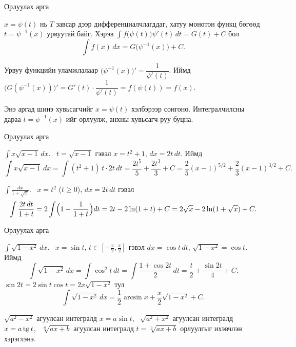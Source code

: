 \begin{frame}[allowframebreaks]{Орлуулах арга}
\begin{theorem}\label{huvsagch}
$x=\psi(t)$ нь $T$ завсар дээр дифференциалчлагддаг, хатуу монотон функц бөгөөд $t=\psi^{-1}(x)$ урвуутай байг. Хэрэв
$\displaystyle\int f\bigl(\psi(t)\bigr)\psi'(t)\,dt=G(t)+C$ бол
\[
\int f(x)\,dx=G\bigl(\psi^{-1}(x)\bigr)+C .
\]
\end{theorem}
\begin{prof}
Урвуу функцийн уламжлалаар $\bigl(\psi^{-1}(x)\bigr)'=\dfrac1{\psi'(t)}$. Иймд
$\bigl(G(\psi^{-1}(x))\bigr)'=G'(t)\cdot\dfrac1{\psi'(t)}=f(\psi(t))=f(x)$.
\end{prof}
\begin{remark}
Энэ аргад шинэ хувьсагчийг $x=\psi(t)$ хэлбэрээр сонгоно. Интегралчилсны дараа $t=\psi^{-1}(x)$-ийг орлуулж, анхны хувьсагч руу буцна.
\end{remark}
\end{frame}

\begin{frame}[allowframebreaks]{Орлуулах арга}
\begin{example}
$\displaystyle\int x\sqrt{x-1}\,dx$. \ $t=\sqrt{x-1}$ гэвэл $x=t^2+1$, $dx=2t\,dt$. Иймд
\[
\int x\sqrt{x-1}\,dx=\int(t^2+1)\,t\cdot2t\,dt=\frac{2t^5}{5}+\frac{2t^3}{3}+C
=\frac25(x-1)^{5/2}+\frac23(x-1)^{3/2}+C .
\]
\end{example}
\begin{example}
$\displaystyle\int\frac{dx}{1+\sqrt x}$. \ $x=t^2$ ($t\ge0$), $dx=2t\,dt$ гэвэл
\[
\int\frac{2t\,dt}{1+t}=2\int\Bigl(1-\frac1{1+t}\Bigr)dt=2t-2\ln(1+t)+C=2\sqrt x-2\ln(1+\sqrt x)+C .
\]
\end{example}
\end{frame}

\begin{frame}[allowframebreaks]{Орлуулах арга}
\begin{example}
$\displaystyle\int\sqrt{1-x^2}\,dx$. \ $x=\sin t$, $t\in[-\frac\pi2,\frac\pi2]$ гэвэл $dx=\cos t\,dt$, $\sqrt{1-x^2}=\cos t$. Иймд
\[
\int\sqrt{1-x^2}\,dx=\int\cos^2t\,dt=\int\frac{1+\cos2t}{2}\,dt=\frac t2+\frac{\sin2t}{4}+C .
\]
$\sin2t=2\sin t\cos t=2x\sqrt{1-x^2}$ тул
\[
\int\sqrt{1-x^2}\,dx=\frac12\arcsin x+\frac x2\sqrt{1-x^2}+C .
\]
\end{example}
\begin{remark}
$\sqrt{a^2-x^2}$ агуулсан интегралд $x=a\sin t$, \ $\sqrt{a^2+x^2}$ агуулсан интегралд $x=a\operatorname{tg} t$,
\ $\sqrt[n]{ax+b}$ агуулсан интегралд $t=\sqrt[n]{ax+b}$ орлуулгыг ихэвчлэн хэрэглэнэ.
\end{remark}
\end{frame}

